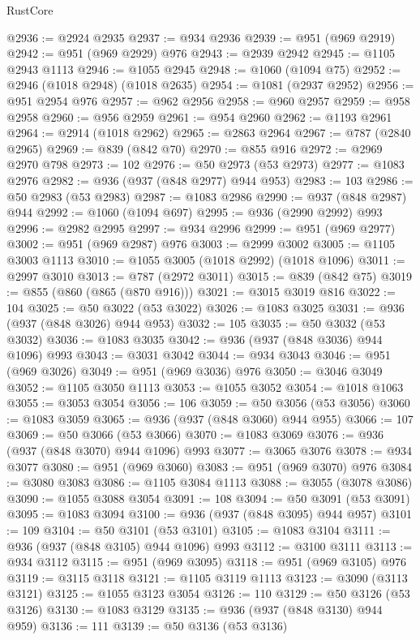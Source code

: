 \begin{lexlean}{RustCore}
\begin{coremodule}
@2936 := @2924 @2935
@2937 := @934 @2936
@2939 := @951 (@969 @2919)
@2942 := @951 (@969 @2929) @976
@2943 := @2939 @2942
@2945 := @1105 @2943 @1113
@2946 := @1055 @2945
@2948 := @1060 (@1094 @75)
@2952 := @2946 (@1018 @2948) (@1018 @2635)
@2954 := @1081 (@2937 @2952)
@2956 := @951 @2954 @976
@2957 := @962 @2956
@2958 := @960 @2957
@2959 := @958 @2958
@2960 := @956 @2959
@2961 := @954 @2960
@2962 := @1193 @2961
@2964 := @2914 (@1018 @2962)
@2965 := @2863 @2964
@2967 := @787 (@2840 @2965)
@2969 := @839 (@842 @70)
@2970 := @855 @916
@2972 := @2969 @2970 @798
@2973 := 102
@2976 := @50 @2973 (@53 @2973)
@2977 := @1083 @2976
@2982 := @936 (@937 (@848 @2977) @944 @953)
@2983 := 103
@2986 := @50 @2983 (@53 @2983)
@2987 := @1083 @2986
@2990 := @937 (@848 @2987) @944
@2992 := @1060 (@1094 @697)
@2995 := @936 (@2990 @2992) @993
@2996 := @2982 @2995
@2997 := @934 @2996
@2999 := @951 (@969 @2977)
@3002 := @951 (@969 @2987) @976
@3003 := @2999 @3002
@3005 := @1105 @3003 @1113
@3010 := @1055 @3005 (@1018 @2992) (@1018 @1096)
@3011 := @2997 @3010
@3013 := @787 (@2972 @3011)
@3015 := @839 (@842 @75)
@3019 := @855 (@860 (@865 (@870 @916)))
@3021 := @3015 @3019 @816
@3022 := 104
@3025 := @50 @3022 (@53 @3022)
@3026 := @1083 @3025
@3031 := @936 (@937 (@848 @3026) @944 @953)
@3032 := 105
@3035 := @50 @3032 (@53 @3032)
@3036 := @1083 @3035
@3042 := @936 (@937 (@848 @3036) @944 @1096) @993
@3043 := @3031 @3042
@3044 := @934 @3043
@3046 := @951 (@969 @3026)
@3049 := @951 (@969 @3036) @976
@3050 := @3046 @3049
@3052 := @1105 @3050 @1113
@3053 := @1055 @3052
@3054 := @1018 @1063
@3055 := @3053 @3054
@3056 := 106
@3059 := @50 @3056 (@53 @3056)
@3060 := @1083 @3059
@3065 := @936 (@937 (@848 @3060) @944 @955)
@3066 := 107
@3069 := @50 @3066 (@53 @3066)
@3070 := @1083 @3069
@3076 := @936 (@937 (@848 @3070) @944 @1096) @993
@3077 := @3065 @3076
@3078 := @934 @3077
@3080 := @951 (@969 @3060)
@3083 := @951 (@969 @3070) @976
@3084 := @3080 @3083
@3086 := @1105 @3084 @1113
@3088 := @3055 (@3078 @3086)
@3090 := @1055 @3088 @3054
@3091 := 108
@3094 := @50 @3091 (@53 @3091)
@3095 := @1083 @3094
@3100 := @936 (@937 (@848 @3095) @944 @957)
@3101 := 109
@3104 := @50 @3101 (@53 @3101)
@3105 := @1083 @3104
@3111 := @936 (@937 (@848 @3105) @944 @1096) @993
@3112 := @3100 @3111
@3113 := @934 @3112
@3115 := @951 (@969 @3095)
@3118 := @951 (@969 @3105) @976
@3119 := @3115 @3118
@3121 := @1105 @3119 @1113
@3123 := @3090 (@3113 @3121)
@3125 := @1055 @3123 @3054
@3126 := 110
@3129 := @50 @3126 (@53 @3126)
@3130 := @1083 @3129
@3135 := @936 (@937 (@848 @3130) @944 @959)
@3136 := 111
@3139 := @50 @3136 (@53 @3136)

\end{coremodule}
\end{lexlean}
